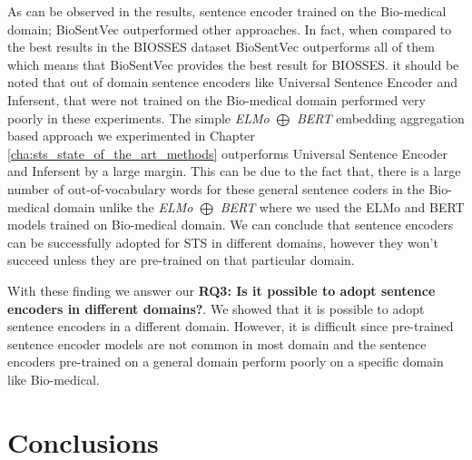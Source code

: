 \begin{table}[htb]
	\centering
	\caption[Results comparison for BIOSSES with different sentence encoders]{Results for BIOSSES dataset with different sentence encoders compared with top results reported for BIOSSES. Additionally, we report the results of the best model from Chapter \ref{cha:sts_state_of_the_art_methods}; \textit{ELMo $\bigoplus$ BERT}. For each variant, Pearson Correlation ($\bm{\rho}$) is reported between the predicted values and the gold labels of the test set.}  
	\label{tab:biosses_sentence_encoders}
\end{table} 

As can be observed in the results, sentence encoder trained on the Bio-medical domain; BioSentVec \cite{8904728} outperformed other approaches. In fact, when compared to the best results in the BIOSSES dataset BioSentVec outperforms all of them which means that BioSentVec provides the best result for BIOSSES. it should be noted that out of domain sentence encoders like Universal Sentence Encoder and Infersent, that were not trained on the Bio-medical domain performed very poorly in these experiments. The simple \textit{ELMo $\bigoplus$ BERT} embedding aggregation based approach we experimented in Chapter \ref{cha:sts_state_of_the_art_methods} outperforms Universal Sentence Encoder and Infersent by a large margin. This can be due to the fact that, there is a large number of out-of-vocabulary words for these general sentence coders in the Bio-medical domain unlike the \textit{ELMo $\bigoplus$ BERT} where we used the ELMo and BERT models trained on Bio-medical domain. We can conclude that sentence encoders can be successfully adopted for STS in different domains, however they won't succeed unless they are pre-trained on that particular domain. 

With these finding we answer our \textbf{RQ3: Is it possible to adopt sentence encoders in different domains?}. We showed that it is possible to adopt sentence encoders in a different domain. However, it is difficult since pre-trained sentence encoder models are not common in most domain and the sentence encoders pre-trained on a general domain perform poorly on a specific domain like Bio-medical. 

\section{Conclusions}

